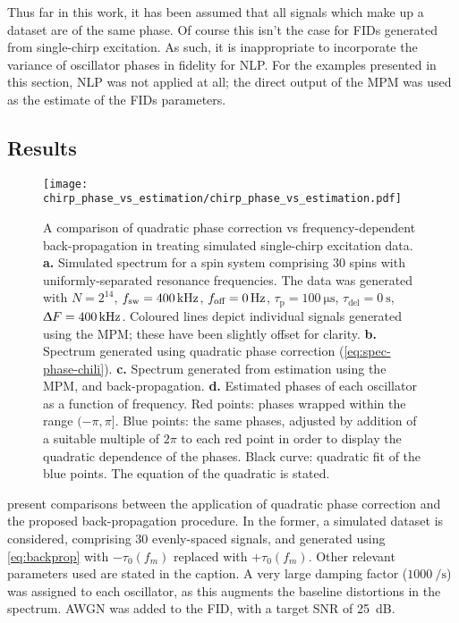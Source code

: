 Thus far in this work, it has been assumed that all signals which make up a
dataset are of the same phase. Of course this isn't the case for \acp{FID}
generated from single-chirp excitation. As such, it is inappropriate to
incorporate the variance of oscillator phases in fidelity for \ac{NLP}.
For the examples presented in this section, \ac{NLP} was not applied at all;
the direct output of the \ac{MPM} was used as the estimate of the \acp{FID}
parameters.

\subsection{Results}
\begin{figure}
    \centering
    \texttt{[image: chirp\_phase\_vs\_estimation/chirp\_phase\_vs\_estimation.pdf]}
    \caption[
        A comparison of quadratic phase correction vs frequency-dependent
        back-propagation in treating simulated single-chirp excitation data.
    ]
    {
        A comparison of quadratic phase correction vs frequency-dependent
        back-propagation in treating simulated single-chirp excitation data.
        \textbf{a.} Simulated spectrum for a spin system comprising 30 spins
        with uniformly-separated resonance frequencies. The data was generated
        with
        $N=2^{14}$,
        $f_{\mathrm{sw}}=\qty{400}{\kilo\hertz}$,
        $f_{\text{off}}=\qty{0}{\hertz}$,
        $\tau_{\text{p}} = \qty{100}{\micro\second}$,
        $\tau_{\text{del}} = \qty{0}{\second}$,
        $\Updelta F = \qty{400}{\kilo\hertz}$.
        Coloured lines depict individual signals generated using the \ac{MPM};
        these have been slightly offset for clarity.
        \textbf{b.} Spectrum generated using quadratic phase correction
        (\cref{eq:spec-phase-chili}).
        \textbf{c.} Spectrum generated from estimation using the \ac{MPM}, and
        back-propagation.
        \textbf{d.} Estimated phases of each oscillator as a function of
        frequency. Red points: phases wrapped within the range $(-\pi, \pi]$.
        Blue points: the same phases, adjusted by addition of a suitable multiple
        of $2 \pi$ to each red point in order to display the quadratic
        dependence of the phases. Black curve: quadratic fit of the blue
        points. The equation of the quadratic is stated.
    }
    \label{fig:bbqchili-sim}
\end{figure}
 present comparisons
between the application of quadratic phase correction and the proposed
back-propagation procedure. In the former, a simulated
dataset is considered, comprising 30 evenly-spaced signals, and generated using
\cref{eq:backprop} with $-\tau_0(f_m)$ replaced with $+\tau_0(f_m)$. Other
relevant parameters used are stated in the caption.
A very large damping factor ($\qty{1000}{\per\second}$) was assigned to each
oscillator, as this augments the baseline distortions in the spectrum.
\ac{AWGN} was added to the \ac{FID}, with a target \ac{SNR} of
\qty{25}{\deci\bel}.

